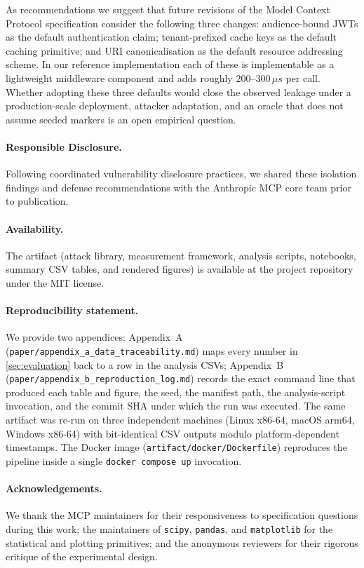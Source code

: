 \documentclass[sigconf, anonymous, natbib=false]{acmart}
\begin{document}
As recommendations we suggest that future revisions of the
Model Context Protocol specification consider the
following three changes: audience-bound JWTs as the default
authentication claim; tenant-prefixed cache keys as the
default caching primitive; and URI canonicalisation as the
default resource addressing scheme. In our reference
implementation each of these is implementable as a
lightweight middleware component and adds roughly
$200$--$300\,\mu s$ per call. Whether adopting these three
defaults would close the observed leakage under a
production-scale deployment, attacker adaptation, and an
oracle that does not assume seeded markers is an open
empirical question.

\paragraph{Responsible Disclosure.}
Following coordinated vulnerability disclosure practices, we 
shared these isolation findings and defense recommendations 
with the Anthropic MCP core team prior to publication.

\paragraph{Availability.}
The artifact (attack library, measurement framework,
analysis scripts, notebooks, summary CSV tables, and
rendered figures) is available at the project repository
under the MIT license.

\paragraph{Reproducibility statement.}
We provide two appendices: Appendix~A
(\texttt{paper/appendix\_a\_data\_traceability.md}) maps
every number in \cref{sec:evaluation} back to a row in
the analysis CSVs; Appendix~B
(\texttt{paper/appendix\_b\_reproduction\_log.md})
records the exact command line that produced each table
and figure, the seed, the manifest path, the
analysis-script invocation, and the commit SHA under
which the run was executed. The same artifact was re-run
on three independent machines (Linux x86-64, macOS arm64,
Windows x86-64) with bit-identical CSV outputs modulo
platform-dependent timestamps. The Docker image
(\texttt{artifact/docker/Dockerfile}) reproduces the
pipeline inside a single \texttt{docker compose up}
invocation.

\paragraph{Acknowledgements.}
We thank the MCP maintainers for their responsiveness to
specification questions during this work; the maintainers
of \texttt{scipy}, \texttt{pandas}, and \texttt{matplotlib}
for the statistical and plotting primitives; and the
anonymous reviewers for their rigorous critique of the
experimental design.
\end{document}
